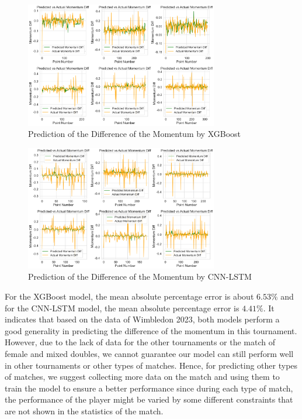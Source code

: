 \documentclass[12pt]{article}
\begin{document}
\begin{figure}[h!]
    \centering
    \includegraphics[width=0.75\textwidth, height=0.45\textwidth]{general.png}
    \caption{Prediction of the Difference of the Momentum by XGBoost}
    \label{fig:12}
\end{figure}

\begin{figure}[h!]
    \centering
    \includegraphics[width=0.75\textwidth, height=0.45\textwidth]{general_lstm.png}
    \caption{Prediction of the Difference of the Momentum by CNN-LSTM}
    \label{fig:13}
\end{figure}

For the XGBoost model, the mean absolute percentage error is about $6.53\%$ and for the CNN-LSTM model, the mean absolute percentage error is $4.41\%$.
It indicates that based on the data of Wimbledon 2023, both models perform a good generality in predicting the difference of the momentum in this tournament.
However, due to the lack of data for the other tournaments or the match of female and mixed doubles, we cannot guarantee our model can still perform well in other tournaments or 
other types of matches. Hence, for predicting other types of matches, we suggest collecting more data on the match and using them to train the model to ensure a better performance since 
during each type of match, the performance of the player might be varied by some different constraints that are not shown in the statistics of the match.
\end{document}
